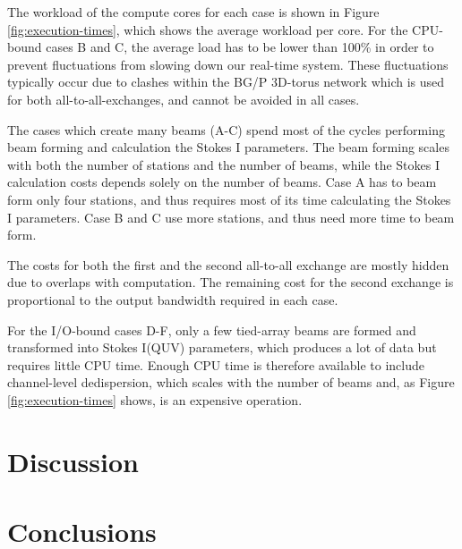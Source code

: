 \documentclass{llncs}
\begin{document}
The workload of the compute cores for each case is shown in Figure \ref{fig:execution-times}, which shows the average workload per core. For the CPU-bound cases B and C, the average load has to be lower than 100\% in order to prevent fluctuations from slowing down our real-time system. These fluctuations typically occur due to clashes within the BG/P 3D-torus network which is used for both all-to-all-exchanges, and cannot be avoided in all cases.

The cases which create many beams (A-C) spend most of the cycles performing beam forming and calculation the Stokes I parameters. The beam forming scales with both the number of stations and the number of beams, while the Stokes I calculation costs depends solely on the number of beams. Case A has to beam form only four stations, and thus requires most of its time calculating the Stokes I parameters. Case B and C use more stations, and thus need more time to beam form.

The costs for both the first and the second all-to-all exchange are mostly hidden due to overlaps with computation. The remaining cost for the second exchange is proportional to the output bandwidth required in each case.

For the I/O-bound cases D-F, only a few tied-array beams are formed and transformed into Stokes I(QUV) parameters, which produces a lot of data but requires little CPU time. Enough CPU time is therefore available to include channel-level dedispersion, which scales with the number of beams and, as Figure \ref{fig:execution-times} shows, is an expensive operation.




\section{Discussion}


\section{Conclusions}




\end{document}
